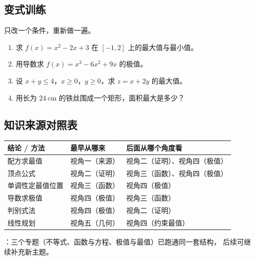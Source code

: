 \begin{inclasstest}
\subsection{变式训练}
只改一个条件，重新做一遍。
\begin{enumerate}
  \item 求 $f(x)=x^2-2x+3$ 在 $[-1,2]$ 上的最大值与最小值。
  \item 用导数求 $f(x)=x^3-6x^2+9x$ 的极值。
  \item 设 $x+y\leq4$，$x\geq0$，$y\geq0$，求 $z=x+2y$ 的最大值。
  \item 用长为 $24\ \mathrm{cm}$ 的铁丝围成一个矩形，面积最大是多少？
\end{enumerate}
\end{inclasstest}

\begin{afterclass}
\subsection{知识来源对照表}
\begin{center}
\footnotesize
\setlength{\tabcolsep}{4pt}
\renewcommand{\arraystretch}{1.35}
\begin{tabular}{p{3.4cm}p{4.0cm}p{5.6cm}}
\toprule
结论 / 方法 & 最早从哪来 & 后面从哪个角度看 \\
\midrule
配方求最值 & 视角一（来源） & 视角二（证明）、视角四（极值） \\
顶点公式 & 视角二（证明） & 视角三（函数）、视角四（极值） \\
单调性定最值位置 & 视角三（函数） & 视角四（极值） \\
导数求极值 & 视角四（极值） & 视角三（函数） \\
判别式法 & 视角四（极值） & 视角二（证明） \\
线性规划 & 视角五（几何） & 视角四（约束最值） \\
\bottomrule
\end{tabular}
\end{center}

：三个专题（不等式、函数与方程、极值与最值）已跑通同一套结构，
后续可继续补充新主题。
\end{afterclass}
